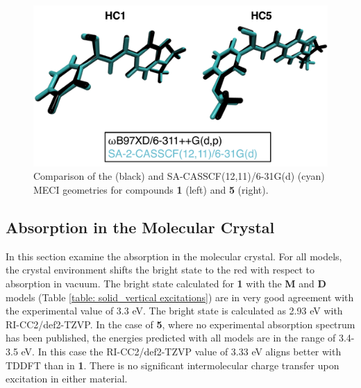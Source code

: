 \begin{figure}
\centering
  \includegraphics[width=0.75\linewidth]{4IntraInterInteractions/MECI_TDDFTvsCASSCF_VAC.pdf}
  \caption[Comparison of MECIs obtained with TDDFT and CASSCF]{Comparison of the \highlevel (black) and SA-CASSCF(12,11)/6-31G(d) (cyan) MECI geometries for compounds \textbf{1} (left) and \textbf{5} (right).}
  \label{figure: MECI_TDDFT_vs_CASSCF_VAC}
\end{figure}

\subsection{Absorption in the Molecular Crystal}\label{section: Inter_absorption}
In this section examine the absorption in the molecular crystal. For all models, the crystal environment shifts the bright state to the red with respect to absorption in vacuum. The bright state calculated for \textbf{1} with the \textbf{M} and \textbf{D} models (Table \ref{table: solid_vertical excitations}) are in very good agreement with the experimental value of 3.3 eV.\cite{Cheng2015} The bright state is calculated as 2.93 eV with RI-CC2/def2-TZVP. In the case of \textbf{5}, where no experimental absorption spectrum has been published, the energies predicted with all models are in the range of 3.4-3.5 eV. In this case the RI-CC2/def2-TZVP value of 3.33 eV aligns better with TDDFT than in \textbf{1}. There is no significant intermolecular charge transfer upon excitation in either material. 

